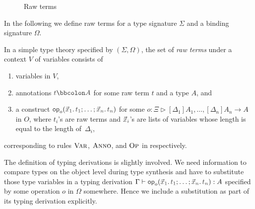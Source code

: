 \begin{figure}
  \centering
  \small
  \caption{Raw terms}
  \label{fig:raw-terms}
\end{figure}

In the following we define raw terms for a type signature $\Sigma$ and a binding signature $\Omega$.
\begin{definition}
  In a simple type theory specified by $(\Sigma, \Omega)$, the set of \emph{raw terms} under a context $V$ of variables consists of
  \begin{enumerate}
    \item variables in $V$,
    \item annotations $\isTerm{t \annotate A}$ for some raw term $t$ and a type $A$, and
    \item a construct $\tmOpts$ for some $o \colon \Xi \rhd [\Delta_1]A_{1}, \ldots, [\Delta_{n}] A_{n} \to A$ in $O$, where $t_i$'s are raw terms and $\vars{x}_{\isTerm{i}}$'s are lists of variables whose length is equal to the length of~$\Delta_i$,
  \end{enumerate}
  corresponding to rules $\textnormal{\textsc{Var}}$, $\textnormal{\textsc{Anno}}$, and $\textnormal{\textsc{Op}}$ in  respectively.
\end{definition}


The definition of typing derivations is slightly involved.
We need information to compare types on the object level during type synthesis and have to substitute those type variables in a typing derivation $\Gamma \vdash \tmOpts : A$ specified by some operation $o$ in $\Omega$ somewhere.
Hence we include a substitution as part of its typing derivation explicitly.

